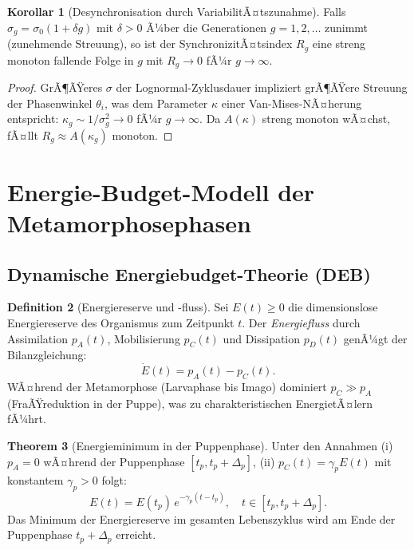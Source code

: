 ﻿\documentclass[12pt, a4paper]{article}
\theoremstyle{definition}
\newtheorem{theorem}{Theorem}[section]
\newtheorem{korollar}[theorem]{Korollar}
\newtheorem{definition}[theorem]{Definition}
\begin{document}
\begin{korollar}[Desynchronisation durch VariabilitÃ¤tszunahme]
\label{cor:desynchronisation}
Falls $\sigma_g = \sigma_0 (1 + \delta g)$ mit $\delta > 0$ Ã¼ber die Generationen
$g = 1, 2, \ldots$ zunimmt (zunehmende Streuung), so ist der SynchronizitÃ¤tsindex
$R_g$ eine streng monoton fallende Folge in $g$ mit $R_g \to 0$ fÃ¼r $g \to \infty$.
\end{korollar}

\begin{proof}
GrÃ¶ÃŸeres $\sigma$ der Lognormal-Zyklusdauer impliziert grÃ¶ÃŸere Streuung der
Phasenwinkel $\theta_i$, was dem Parameter $\kappa$ einer Van-Mises-NÃ¤herung
entspricht: $\kappa_g \sim 1/\sigma_g^2 \to 0$ fÃ¼r $g \to \infty$. Da $A(\kappa)$
streng monoton wÃ¤chst, fÃ¤llt $R_g \approx A(\kappa_g)$ monoton. \hfill
\end{proof}

\section{Energie-Budget-Modell der Metamorphosephasen}

\subsection{Dynamische Energiebudget-Theorie (DEB)}

\begin{definition}[Energiereserve und -fluss]\label{def:deb}
Sei $E(t) \geq 0$ die dimensionslose Energiereserve des Organismus zum Zeitpunkt $t$.
Der \emph{Energiefluss} durch Assimilation $p_A(t)$, Mobilisierung $p_C(t)$
und Dissipation $p_D(t)$ genÃ¼gt der Bilanzgleichung:
\[
  \dot{E}(t) = p_A(t) - p_C(t).
\]
WÃ¤hrend der Metamorphose (Larvaphase bis Imago) dominiert $p_C \gg p_A$ (FraÃŸreduktion
in der Puppe), was zu charakteristischen EnergietÃ¤lern fÃ¼hrt.
\end{definition}

\begin{theorem}[Energieminimum in der Puppenphase]\label{thm:energie-minimum}
Unter den Annahmen (i) $p_A = 0$ wÃ¤hrend der Puppenphase $[t_p, t_p + \Delta_p]$,
(ii) $p_C(t) = \gamma_p E(t)$ mit konstantem $\gamma_p > 0$ folgt:
\[
  E(t) = E(t_p)\,e^{-\gamma_p(t - t_p)}, \quad t \in [t_p, t_p + \Delta_p].
\]
Das Minimum der Energiereserve im gesamten Lebenszyklus wird am Ende der
Puppenphase $t_p + \Delta_p$ erreicht.
\end{theorem}
\end{document}
